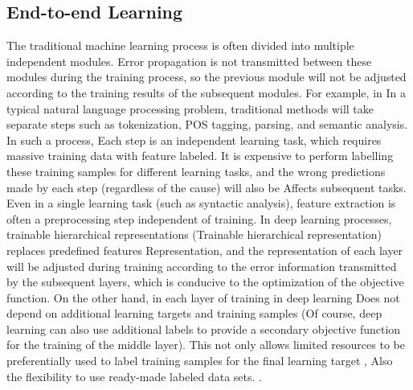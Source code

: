 \documentclass[11pt,en]{elegantpaper}
\begin{document}
\subsection{End-to-end Learning}
The traditional machine learning process is often divided into multiple independent modules. Error propagation is not transmitted between these modules during the training process, so the previous module will not be adjusted according to the training results of the subsequent modules. For example, in In a typical natural language processing problem, traditional methods will take separate steps such as tokenization, POS tagging, parsing, and semantic analysis. In such a process, Each step is an independent learning task, which requires massive training data with feature labeled. It is expensive to perform labelling these training samples for different learning tasks, and the wrong predictions made by each step (regardless of the cause) will also be Affects subsequent tasks. Even in a single learning task (such as syntactic analysis), feature extraction is often a preprocessing step independent of training. In deep learning processes, trainable hierarchical representations (Trainable hierarchical representation) replaces predefined features Representation, and the representation of each layer will be adjusted during training according to the error information transmitted by the subsequent layers, which is conducive to the optimization of the objective function\cite{31}. On the other hand, in each layer of training in deep learning Does not depend on additional learning targets and training samples (Of course, deep learning can also use additional labels to provide a secondary objective function for the training of the middle layer). This not only allows limited resources to be preferentially used to label training samples for the final learning target , Also the flexibility to use ready-made labeled data sets.
.
\end{document}
